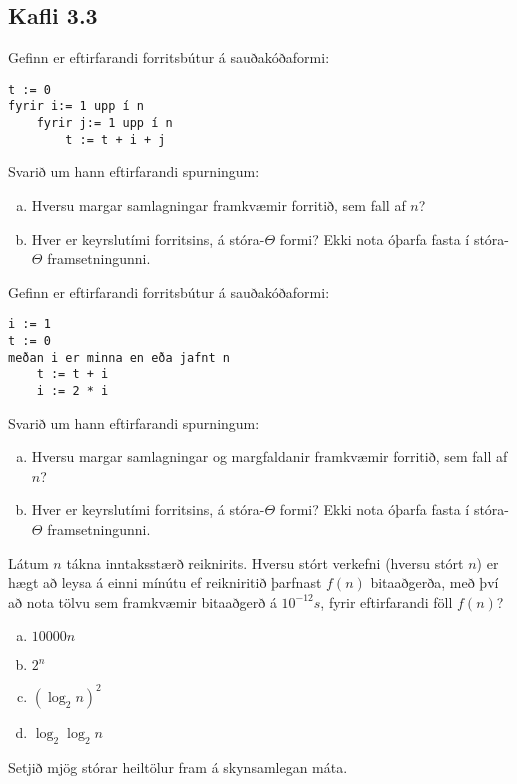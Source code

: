 \documentclass{exam}
\begin{document}
\subsection{Kafli 3.3}
\begin{questions}
\question Gefinn er eftirfarandi forritsbútur á sauðakóðaformi:

\begin{verbatim}
t := 0
fyrir i:= 1 upp í n
    fyrir j:= 1 upp í n
        t := t + i + j
\end{verbatim}

Svarið um hann eftirfarandi spurningum:
\begin{enumerate}[a)]
 \item Hversu margar samlagningar framkvæmir forritið, sem fall af $n$?
 \item Hver er keyrslutími forritsins, á stóra-$\Theta$ formi? Ekki nota óþarfa fasta í stóra-$\Theta$ framsetningunni.
\end{enumerate}

\question Gefinn er eftirfarandi forritsbútur á sauðakóðaformi:

\begin{verbatim}
i := 1
t := 0
meðan i er minna en eða jafnt n
    t := t + i
    i := 2 * i
\end{verbatim}

Svarið um hann eftirfarandi spurningum:
\begin{enumerate}[a)]
 \item Hversu margar samlagningar og margfaldanir framkvæmir forritið, sem fall af $n$?
 \item Hver er keyrslutími forritsins, á stóra-$\Theta$ formi? Ekki nota óþarfa fasta í stóra-$\Theta$ framsetningunni.
\end{enumerate}

\newpage

\question Látum $n$ tákna inntaksstærð reiknirits. Hversu stórt verkefni (hversu stórt $n$) er hægt að leysa á einni mínútu ef reikniritið þarfnast $f(n)$ bitaaðgerða, með því að nota tölvu sem framkvæmir bitaaðgerð á $10^{-12}s$, fyrir eftirfarandi föll $f(n)$?

\begin{enumerate}[a)]
 \item $10000n$
 \item $2^n$
 \item $(\log_2 n)^2$
 \item $\log_2 \log_2 n$
\end{enumerate}
Setjið mjög stórar heiltölur fram á skynsamlegan máta.


\end{questions}
\end{document}
